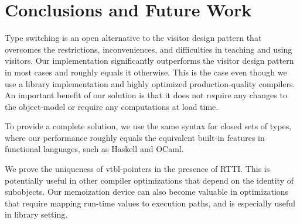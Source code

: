 \section{Conclusions and Future Work} %
\label{sec:cc}

Type switching is an open alternative to the visitor design pattern that overcomes 
the restrictions, inconveniences, and difficulties in teaching and using 
visitors. Our implementation significantly
outperforms the visitor design pattern in most cases and roughly equals it otherwise.
This is the case even though we use a library implementation and highly optimized
production-quality compilers. An important benefit of our solution is that it does not 
require any changes to the \Cpp{} object-model or require any computations at load 
time.

To provide a complete solution, we use the same syntax for closed sets of types, where our
performance roughly equals the equivalent built-in features in functional languages,
such as Haskell and OCaml.

We prove the uniqueness of vtbl-pointers in the presence of RTTI. This is 
potentially useful in other compiler optimizations that depend on the 
identity of subobjects. Our memoization device can also become valuable in 
optimizations that require mapping run-time values to execution paths, 
and is especially useful in library setting.


